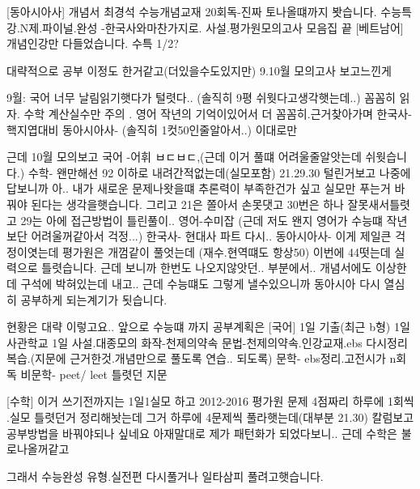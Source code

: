     [동아시아사]
    개념서 최경석 수능개념교재 20회독-진짜 토나올떄까지 봣습니다.
    수능특강.N제.파이널.완성 -한국사와마찬가지로.
    사설.평가원모의고사 모음집 끝
    [베트남어]
    개념인강만 다들었습니다.
    수특 1/2?
    \vspace{5mm}

    대략적으로 공부 이정도 한거같고(더있을수도있지만)
    9.10월 모의고사 보고느낀게
    \vspace{5mm}

    9월: 국어 너무 날림읽기햇다가 털렷다.. (솔직히 9평 쉬웟다고생각햇는데..)
    꼼꼼히 읽자.
    수학 계산실수만 주의 .
    영어 작년의 기억이있어서 더 꼼꼼히.근거찾아가며
    한국사-핵지엽대비
    동아시아사- (솔직히 1컷50인줄알아서..) 이대로만
    \vspace{5mm}

    근데 10월 모의보고
    국어 -어휘 ㅂㄷㅂㄷ,(근데 이거 풀떄 어려울줄알앗는데 쉬웟습니다.)
    수학- 왠만해선 92 이하로 내려간적없는데(실모포함) 21.29.30 털린거보고 나중에 답보니까
    아.. 내가 새로운 문제나왓을떄 추론력이 부족한건가 싶고 실모만 푸는거 바꿔야 된다는 생각을햇습니다.
    그리고 21은 쫄아서 손못댓고 30번은 하나 잘못새서틀렷고 29는 아에 접근방법이 틀린풀이..
    영어-수미잡 (근데 저도 왠지 영어가 수능떄 작년보단 어려울꺼같아서 걱정...)
    한국사- 현대사 파트 다시..
    동아시아사- 이게 제일큰 걱정이엿는데
    평가원은 개껌같이 풀엇는데 (재수.현역떄도 항상50) 이번에 44떳는데 실력으로 틀렷습니다.
    근데 보니까 한번도 나오지않앗던.. 부분에서.. 개념서에도 이상한데 구석에 박혀있는데 내고..
    근데 수능떄도 그렇게 낼수있으니까 동아시아 다시 열심히 공부하게 되는계기가 됫습니다.
    \vspace{5mm}

    현황은 대략 이렇고요..
    앞으로 수능떄 까지 공부계획은
    [국어] 1일 기출(최근 b형) 1일 사관학교 1일 사설.대종모의
    화작-천제의약속
    문법-천제의약속.인강교재.ebs 다시정리 복습.(지문에 근거한것.개념만으로 풀도록 연습.. 되도록)
    문학- ebs정리.고전시가 n회독
    비문학- peet/ leet 틀렷던 지문
    \vspace{5mm}

    [수학]
    이거 쓰기전까지는 1일1실모 하고
    2012-2016 평가원 문제 4점짜리 하루에 1회씩 .실모 틀렷던거 정리해놧는데 그거 하루에 4문제씩 풀라햇는데(대부분 21.30)
    칼럼보고 공부방법을 바꿔야되나 싶네요
    아재말대로 제가 패턴화가 되었다보니..
    근데 수학은 불로나올꺼같고
    \vspace{5mm}

    그래서 수능완성 유형.실전편 다시풀거나 일타삼피 풀려고햇습니다.
    \vspace{5mm}

